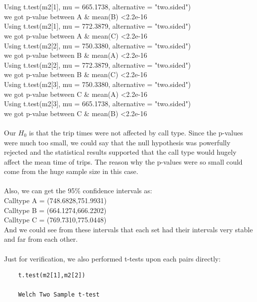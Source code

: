 \documentclass[letterpaper, 12 pt, conference]{article}
\begin{document}
\begin{enumerate}
    \\
    \\Using t.test(m2[1], mu = 665.1738, alternative = "two.sided")
    \\we got p-value between A \& mean(B) \textless 2.2e-16
    \\Using t.test(m2[1], mu = 772.3879, alternative = "two.sided")
    \\we got p-value between A \& mean(C) \textless 2.2e-16
    \\Using t.test(m2[2], mu = 750.3380, alternative = "two.sided")
    \\we got p-value between B \& mean(A) \textless 2.2e-16
    \\Using t.test(m2[2], mu = 772.3879, alternative = "two.sided")
    \\we got p-value between B \& mean(C) \textless 2.2e-16
    \\Using t.test(m2[3], mu = 750.3380, alternative = "two.sided")
    \\we got p-value between C \& mean(A) \textless 2.2e-16
    \\Using t.test(m2[3], mu = 665.1738, alternative = "two.sided")
    \\we got p-value between C \& mean(B) \textless 2.2e-16
    \\
    \\Our $H_0$ is that the trip times were not affected by call type. Since the p-values were much too small, we could say that the null hypothesis was powerfully rejected and the statistical results supported that the call type would hugely affect the mean time of trips. The reason why the p-values were so small could come from the huge sample size in this case.
    \\
    \\Also, we can get the 95\% confidence intervals as:
    \\Calltype A = (748.6828,751.9931)    
    \\Calltype B = (664.1274,666.2202)    
    \\Calltype C = (769.7310,775.0448)
    \\And we could see from these intervals that each set had their intervals very stable and far from each other.
    \\
    \\Just for verification, we also performed t-tests upon each pairs directly:  
    \begin{lstlisting}
    t.test(m2[1],m2[2])

    Welch Two Sample t-test


\end{lstlisting}
\end{enumerate}
\end{document}

